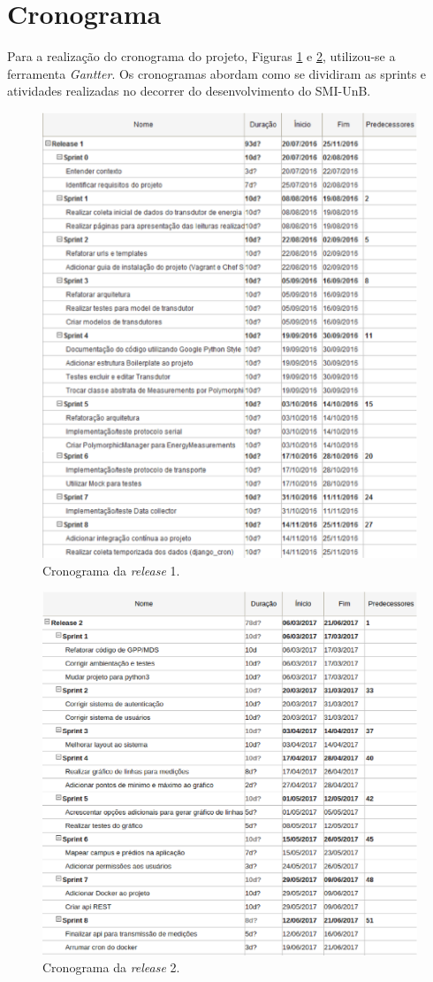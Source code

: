 \section{Cronograma}
Para a realização do cronograma do projeto, Figuras \ref{cronograma} e \ref{cronograma_2}, utilizou-se a ferramenta \textit{Gantter}. Os cronogramas abordam como se dividiram as sprints e atividades realizadas no decorrer do desenvolvimento do SMI-UnB.

\begin{figure}[!htpb]
    \centering
    \includegraphics[keepaspectratio=true,scale=0.6]{figuras/cronograma.eps}
    \caption{Cronograma da \textit{release} 1.}
    \label{cronograma}
\end{figure}

\begin{figure}[!htpb]
    \centering
    \includegraphics[keepaspectratio=true,scale=0.6]{figuras/cronograma_2.eps}
    \caption{Cronograma da \textit{release} 2.}
    \label{cronograma_2}
\end{figure}